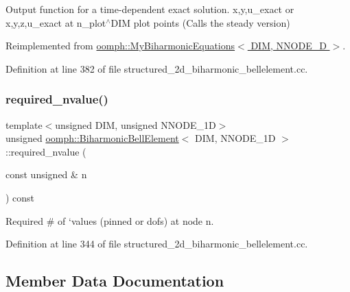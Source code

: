 Output function for a time-\/dependent exact solution. x,y,u\+\_\+exact or x,y,z,u\+\_\+exact at n\+\_\+plot$^\wedge$\+D\+IM plot points (Calls the steady version) 



Reimplemented from \hyperlink{classoomph_1_1MyBiharmonicEquations_a95b35b18fac5212ade1a81c26657bcdb}{oomph\+::\+My\+Biharmonic\+Equations$<$ D\+I\+M, N\+N\+O\+D\+E\+\_\+D $>$}.



Definition at line 382 of file structured\+\_\+2d\+\_\+biharmonic\+\_\+bellelement.\+cc.

\mbox{\label{classoomph_1_1BiharmonicBellElement_ad01e8642edd693134c4ca1960f267712}} 
\subsubsection{\texorpdfstring{required\+\_\+nvalue()}{required\_nvalue()}}
{\footnotesize\ttfamily template$<$unsigned D\+IM, unsigned N\+N\+O\+D\+E\+\_\+1D$>$ \\
unsigned \hyperlink{classoomph_1_1BiharmonicBellElement}{oomph\+::\+Biharmonic\+Bell\+Element}$<$ D\+IM, N\+N\+O\+D\+E\+\_\+1D $>$\+::required\+\_\+nvalue (\begin{DoxyParamCaption}\item[{const unsigned \&}]{n }\end{DoxyParamCaption}) const\hspace{0.3cm}{\ttfamily [inline]}}



Required \# of `values\textquotesingle{} (pinned or dofs) at node n. 



Definition at line 344 of file structured\+\_\+2d\+\_\+biharmonic\+\_\+bellelement.\+cc.



\subsection{Member Data Documentation}
\mbox{\label{classoomph_1_1BiharmonicBellElement_af635ad2551d689355fb7c72c779ce087}} 
